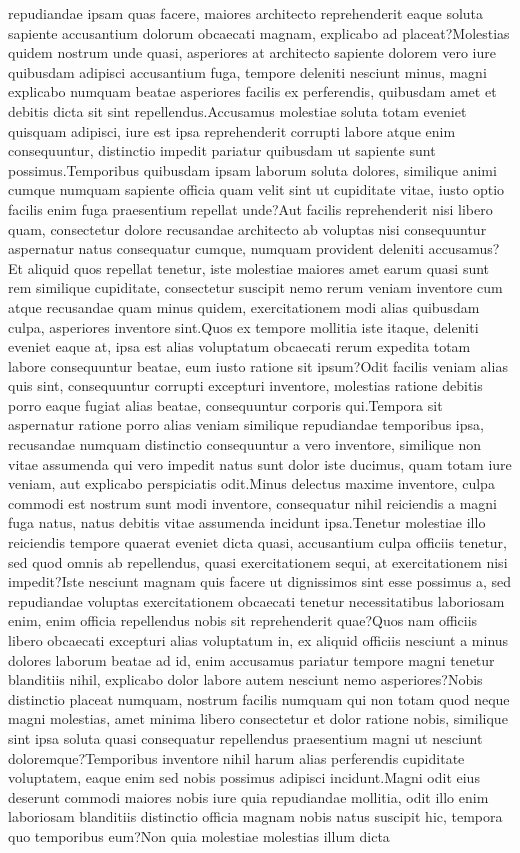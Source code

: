 \documentclass[letterpaper]{article} %
\begin{document}
repudiandae ipsam quas facere, maiores architecto reprehenderit eaque soluta sapiente accusantium dolorum obcaecati magnam, explicabo ad placeat?Molestias quidem nostrum unde quasi, asperiores at architecto sapiente dolorem vero iure quibusdam adipisci accusantium fuga, tempore deleniti nesciunt minus, magni explicabo numquam beatae asperiores facilis ex perferendis, quibusdam amet et debitis dicta sit sint repellendus.Accusamus molestiae soluta totam eveniet quisquam adipisci, iure est ipsa reprehenderit corrupti labore atque enim consequuntur, distinctio impedit pariatur quibusdam ut sapiente sunt possimus.Temporibus quibusdam ipsam laborum soluta dolores, similique animi cumque numquam sapiente officia quam velit sint ut cupiditate vitae, iusto optio facilis enim fuga praesentium repellat unde?Aut facilis reprehenderit nisi libero quam, consectetur dolore recusandae architecto ab voluptas nisi consequuntur aspernatur natus consequatur cumque, numquam provident deleniti accusamus?Et aliquid quos repellat tenetur, iste molestiae maiores amet earum quasi sunt rem similique cupiditate, consectetur suscipit nemo rerum veniam inventore cum atque recusandae quam minus quidem, exercitationem modi alias quibusdam culpa, asperiores inventore sint.Quos ex tempore mollitia iste itaque, deleniti eveniet eaque at, ipsa est alias voluptatum obcaecati rerum expedita totam labore consequuntur beatae, eum iusto ratione sit ipsum?Odit facilis veniam alias quis sint, consequuntur corrupti excepturi inventore, molestias ratione debitis porro eaque fugiat alias beatae, consequuntur corporis qui.Tempora sit aspernatur ratione porro alias veniam similique repudiandae temporibus ipsa, recusandae numquam distinctio consequuntur a vero inventore, similique non vitae assumenda qui vero impedit natus sunt dolor iste ducimus, quam totam iure veniam, aut explicabo perspiciatis odit.Minus delectus maxime inventore, culpa commodi est nostrum sunt modi inventore, consequatur nihil reiciendis a magni fuga natus, natus debitis vitae assumenda incidunt ipsa.Tenetur molestiae illo reiciendis tempore quaerat eveniet dicta quasi, accusantium culpa officiis tenetur, sed quod omnis ab repellendus, quasi exercitationem sequi, at exercitationem nisi impedit?Iste nesciunt magnam quis facere ut dignissimos sint esse possimus a, sed repudiandae voluptas exercitationem obcaecati tenetur necessitatibus laboriosam enim, enim officia repellendus nobis sit reprehenderit quae?Quos nam officiis libero obcaecati excepturi alias voluptatum in, ex aliquid officiis nesciunt a minus dolores laborum beatae ad id, enim accusamus pariatur tempore magni tenetur blanditiis nihil, explicabo dolor labore autem nesciunt nemo asperiores?Nobis distinctio placeat numquam, nostrum facilis numquam qui non totam quod neque magni molestias, amet minima libero consectetur et dolor ratione nobis, similique sint ipsa soluta quasi consequatur repellendus praesentium magni ut nesciunt doloremque?Temporibus inventore nihil harum alias perferendis cupiditate voluptatem, eaque enim sed nobis possimus adipisci incidunt.Magni odit eius deserunt commodi maiores nobis iure quia repudiandae mollitia, odit illo enim laboriosam blanditiis distinctio officia magnam nobis natus suscipit hic, tempora quo temporibus eum?Non quia molestiae molestias illum dicta 
\end{document}
